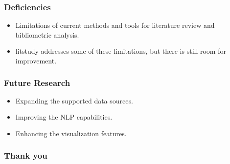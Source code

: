 \documentclass{beamer}
\begin{document}
\begin{frame}
\frametitle{Deficiencies}
\begin{itemize}
\item Limitations of current methods and tools for literature review and bibliometric analysis.
\item litstudy addresses some of these limitations, but there is still room for improvement.
\end{itemize}
\end{frame}

\begin{frame}
\frametitle{Future Research}
\begin{itemize}
\item Expanding the supported data sources.
\item Improving the NLP capabilities.
\item Enhancing the visualization features.
\end{itemize}
\end{frame}

\begin{frame}
\frametitle{Thank you}
\end{frame}
\end{document}
